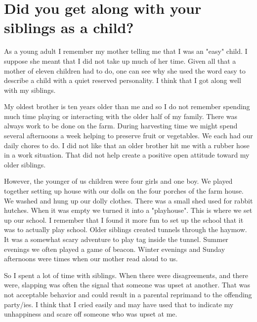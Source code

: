 \section{Did you get along with your siblings as a child?}
As a young adult I remember my mother telling me that I was an "easy" child.
I suppose she meant that I did not take up much of her time.
Given all that a mother of eleven children had to do, one can see why she used the word easy to describe a child with a quiet reserved personality.
I think that I got along well with my siblings.

My oldest brother is ten years older than me and so I do not remember spending much time playing or interacting with the older half of my family.
There was always work to be done on the farm.
During harvesting time we might spend several afternoons a week helping to preserve fruit or vegetables.
We each had our daily chores to do.
I did not like that an older brother hit me with a rubber hose in a work situation.
That did not help create a positive open attitude toward my older siblings.

However, the younger of us children were four girls and one boy.
We played together setting up house with our dolls on the four porches of the farm house.
We washed and hung up our dolly clothes.
There was a small shed used for rabbit hutches.
When it was empty we turned it into a "playhouse".
This is where we set up our school.
I remember that I found it more fun to set up the school that it was to actually play school.
Older siblings created tunnels through the haymow.
It was a somewhat scary adventure to play tag inside the tunnel.
Summer evenings we often played a game of beacon.
Winter evenings and Sunday afternoons were times when our mother read aloud to us.

So I spent a lot of time with siblings.
When there were disagreements, and there were, slapping was often the signal that someone was upset at another.
That was not acceptable behavior and could result in a parental reprimand to the offending party/ies.
I think that I cried easily and may have used that to indicate my unhappiness and scare off someone who was upset at me.





